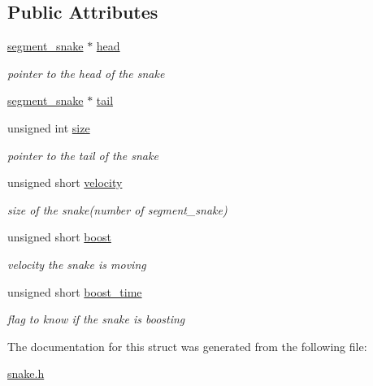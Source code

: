 \subsection*{Public Attributes}
\begin{DoxyCompactItemize}
\item 
\hyperlink{group__snake_ga40f634d31a1f9372bd182d65da207a21}{segment\+\_\+snake} $\ast$ \hyperlink{group__snake_gaf63e50ac65f365d67ae3975a178cba8c}{head}
\begin{DoxyCompactList}\small\item\em pointer to the head of the snake \end{DoxyCompactList}\item 
\hyperlink{group__snake_ga40f634d31a1f9372bd182d65da207a21}{segment\+\_\+snake} $\ast$ \hyperlink{group__snake_gada92e10f60af5b1afdb7318df07a1a33}{tail}
\item 
unsigned int \hyperlink{group__snake_ga29ba822024f7651a9fa0c80df840252b}{size}
\begin{DoxyCompactList}\small\item\em pointer to the tail of the snake \end{DoxyCompactList}\item 
unsigned short \hyperlink{group__snake_gac444a5a9306233f5be0b603335785b3d}{velocity}
\begin{DoxyCompactList}\small\item\em size of the snake(number of segment\+\_\+snake) \end{DoxyCompactList}\item 
unsigned short \hyperlink{group__snake_ga7339bbc2027ffeb1ce00f24a834610cc}{boost}
\begin{DoxyCompactList}\small\item\em velocity the snake is moving \end{DoxyCompactList}\item 
unsigned short \hyperlink{group__snake_ga0b46bc6b402fd8999c6998eca1806c3e}{boost\+\_\+time}
\begin{DoxyCompactList}\small\item\em flag to know if the snake is boosting \end{DoxyCompactList}\end{DoxyCompactItemize}


The documentation for this struct was generated from the following file\+:\begin{DoxyCompactItemize}
\item 
\hyperlink{snake_8h}{snake.\+h}\end{DoxyCompactItemize}
